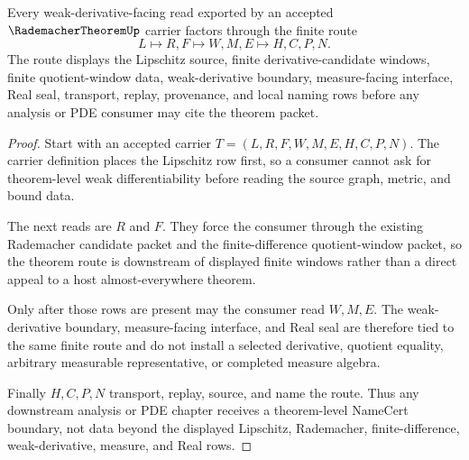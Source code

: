 \begin{theorem}
\label{thm:rademacher-theorem-lipschitz-weak-derivative-route}
Every weak-derivative-facing read exported by an accepted $\RademacherTheoremUp$ carrier factors through the finite route
$$
L \longmapsto R,F \longmapsto W,M,E \longmapsto H,C,P,N .
$$
The route displays the Lipschitz source, finite derivative-candidate windows, finite quotient-window data, weak-derivative boundary, measure-facing interface, Real seal, transport, replay, provenance, and local naming rows before any analysis or PDE consumer may cite the theorem packet.
\end{theorem}
\begin{proof}
Start with an accepted carrier $T=(L,R,F,W,M,E,H,C,P,N)$. The carrier definition places the Lipschitz row first, so a consumer cannot ask for theorem-level weak differentiability before reading the source graph, metric, and bound data.

The next reads are $R$ and $F$. They force the consumer through the existing Rademacher candidate packet and the finite-difference quotient-window packet, so the theorem route is downstream of displayed finite windows rather than a direct appeal to a host almost-everywhere theorem.

Only after those rows are present may the consumer read $W,M,E$. The weak-derivative boundary, measure-facing interface, and Real seal are therefore tied to the same finite route and do not install a selected derivative, quotient equality, arbitrary measurable representative, or completed measure algebra.

Finally $H,C,P,N$ transport, replay, source, and name the route. Thus any downstream analysis or PDE chapter receives a theorem-level NameCert boundary, not data beyond the displayed Lipschitz, Rademacher, finite-difference, weak-derivative, measure, and Real rows.
\end{proof}


